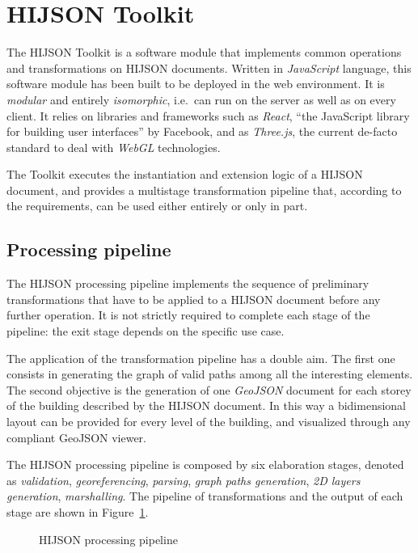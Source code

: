 
\section{HIJSON Toolkit}\label{toolkit}

The HIJSON Toolkit is a software module that implements common operations and
transformations on HIJSON documents. Written in \emph{JavaScript} language,
this software module has been built to be deployed in the web environment. It
is \emph{modular} and entirely \emph{isomorphic}, i.e.~can run on the server
as well as on every client. It relies on libraries and frameworks such as
\emph{React}, ``the JavaScript library for building user interfaces'' by
Facebook, and as \emph{Three.js}, the current de-facto standard to deal with
\emph{WebGL} technologies.

The Toolkit executes the instantiation and extension logic of a HIJSON
document, and provides a multistage transformation pipeline that, according to
the requirements, can be used either entirely or only in part.

\subsection{Processing pipeline}\label{pipeline}

The HIJSON processing pipeline implements the sequence of preliminary
transformations that have to be applied to a HIJSON document before any
further operation. It is not strictly required to complete each stage of
the pipeline: the exit stage depends on the specific use case.

The application of the transformation pipeline has a double aim. The first one
consists in generating the graph of valid paths among all the interesting
elements. The second objective is the generation of one \emph{GeoJSON}
document for each storey of the building described by the HIJSON document. In
this way a bidimensional layout  can be provided for every level of the building, 
and visualized through any compliant GeoJSON viewer.

The HIJSON processing pipeline is composed by six elaboration stages, denoted
as \emph{validation}, \emph{georeferencing}, \emph{parsing}, \emph{graph paths
generation}, \emph{2D layers generation}, \emph{marshalling}. The pipeline of
transformations and the output of each stage are shown in
Figure~\ref{fig:pipeline}.

\begin{figure}[!htbp]
\centering
{}
\caption{HIJSON processing pipeline}
\label{fig:pipeline}
\end{figure}


